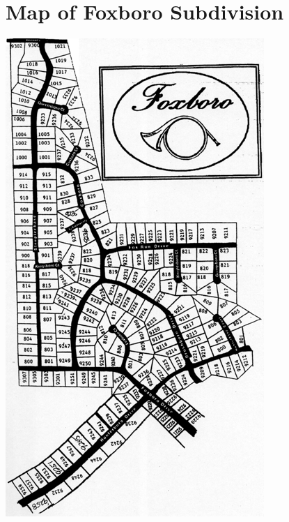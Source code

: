\documentclass[10pt]{report}
\begin{document}

\newpage


\newpage

\section{Map of Foxboro Subdivision}
\includegraphics[]{foxboro_map.png}
\end{document}
